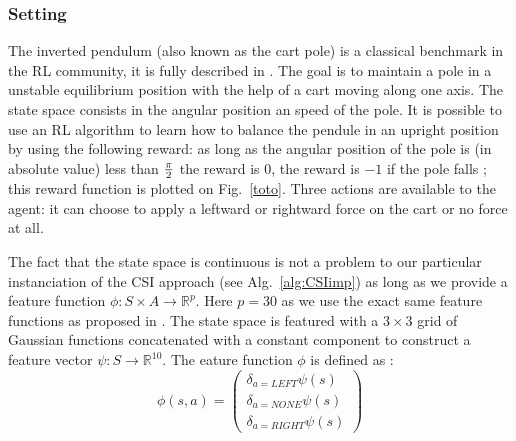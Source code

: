 \documentclass[smallextended]{svjour3}
\begin{document}
\subsubsection{Setting}
The inverted pendulum (also known as the cart pole) is a classical benchmark in the RL community, it is fully described in \cite{lagoudakis2003least}. The goal is to maintain a pole in a unstable equilibrium position with the help of a cart moving along one axis. The state space consists in the angular position an speed of the pole. It is possible to use an RL algorithm to learn how to balance the pendule in an upright position by using the following reward: as long as the angular position of the pole is (in absolute value) less than $\pi \over 2$ the reward is $0$, the reward is $-1$ if the pole falls ; this reward function is plotted on Fig.~\ref{toto}. Three actions are available to the agent: it can choose to apply a leftward or rightward force on the cart or no force at all.

The fact that the state space is continuous is not a problem to our particular instanciation of the CSI approach (see Alg.~\ref{alg:CSIimp}) as long as we provide a feature function $\phi : S\times A \rightarrow \mathbb{R}^p$. Here $p=30$ as we use the exact same feature functions as proposed in \cite{lagoudakis2003least}. The state space is featured with a $3\times 3$ grid of Gaussian functions concatenated with a constant component to construct a feature vector $\psi:S \rightarrow \mathbb{R}^{10}$. The eature function $\phi$ is defined as :
\begin{equation}
  \phi(s,a) = \begin{pmatrix}
     \delta_{a = LEFT}\psi(s)\\
     \delta_{a = NONE}\psi(s)\\
     \delta_{a = RIGHT}\psi(s)
  \end{pmatrix}
\end{equation}
\end{document}
